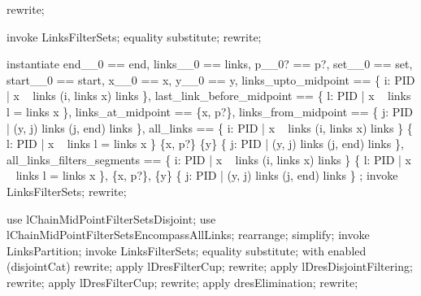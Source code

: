 \begin{forget}
rewrite;
\end{forget}

\begin{forget}[lChainMidPointFilterSetsEquivalence]
invoke LinksFilterSets;
equality substitute;
rewrite;
\end{forget}

\begin{forget}[lChainMidPointFilterSetsDisjoint]
instantiate end\_\_0 == end,
    links\_\_0 == links,
    p\_\_0? == p?,
    set\_\_0 == set,
    start\_\_0 == start,
    x\_\_0 == x,
    y\_\_0 == y,
    links\_upto\_midpoint == \{  i: PID | x \in  \ran~  links \land  (i, links \inv  x) \in  links \plus  \},
    last\_link\_before\_midpoint == \{  l: PID | x \in  \ran~  links \land  l = links \inv  x \},
    links\_at\_midpoint == \{x, p?\},
    links\_from\_midpoint == \{  j: PID | (y, j) \in  links \plus  \land  (j, end) \in  links \plus  \},
    all\_links == \{  i: PID | x \in  \ran~  links \land  (i, links \inv  x) \in  links \plus  \}
        \cup  \{  l: PID | x \in  \ran~  links \land  l = links \inv  x \}
        \cup  \{x, p?\}
        \cup  \{y\} \cup  \{  j: PID | (y, j) \in  links \plus  \land  (j, end) \in  links \plus  \},
    all\_links\_filters\_segments == \langle
        \{  i: PID | x \in  \ran~  links \land  (i, links \inv  x) \in  links \plus  \} \cup
        \{  l: PID | x \in  \ran~  links \land  l = links \inv  x \},
        \{x, p?\},
        \{y\} \cup  \{  j: PID | (y, j) \in  links \plus  \land  (j, end) \in  links \plus  \}
        \rangle;
invoke LinksFilterSets;
rewrite;
\end{forget}

\begin{forget}[lChainMidPointLinksPartition]
use lChainMidPointFilterSetsDisjoint;
use lChainMidPointFilterSetsEncompassAllLinks;
rearrange;
simplify;
invoke LinksPartition;
invoke LinksFilterSets;
equality substitute;
with enabled (disjointCat) rewrite;
apply lDresFilterCup;
rewrite;
apply lDresDisjointFiltering;
rewrite;
apply lDresFilterCup;
rewrite;
apply dresElimination;
rewrite;
\end{forget}

